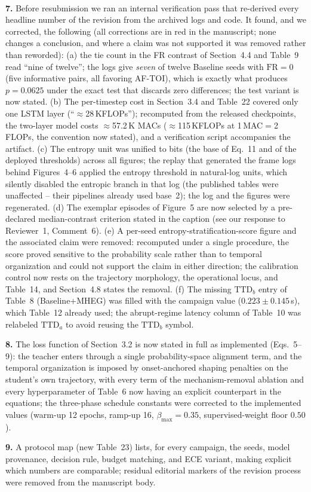 \documentclass[1p,12pt,authoryear]{elsarticle}
\begin{document}
~

\noindent \textbf{7.} Before resubmission we ran an internal verification pass that re-derived every headline number of the revision from the archived logs and code. It found, and we corrected, the following (all corrections are in red in the manuscript; none changes a conclusion, and where a claim was not supported it was removed rather than reworded): (a) the tie count in the FR contrast of Section~4.4 and Table~9 read ``nine of twelve''; the logs give \emph{seven} of twelve Baseline seeds with $\mathrm{FR}=0$ (five informative pairs, all favoring AF-TOI), which is exactly what produces $p=0.0625$ under the exact test that discards zero differences; the test variant is now stated. (b) The per-timestep cost in Section~3.4 and Table~22 covered only one LSTM layer (``$\approx$28\,KFLOPs''); recomputed from the released checkpoints, the two-layer model costs $\approx$57.2\,K MACs ($\approx$115\,KFLOPs at 1\,MAC${}={}$2\,FLOPs, the convention now stated), and a verification script accompanies the artifact. (c) The entropy unit was unified to bits (the base of Eq.~11 and of the deployed thresholds) across all figures; the replay that generated the frame logs behind Figures~4--6 applied the entropy threshold in natural-log units, which silently disabled the entropic branch in that log (the published tables were unaffected -- their pipelines already used base~2); the log and the figures were regenerated. (d) The exemplar episodes of Figure~5 are now selected by a pre-declared median-contrast criterion stated in the caption (see our response to Reviewer~1, Comment~6). (e) A per-seed entropy-stratification-score figure and the associated claim were removed: recomputed under a single procedure, the score proved sensitive to the probability scale rather than to temporal organization and could not support the claim in either direction; the calibration control now rests on the trajectory morphology, the operational locus, and Table~14, and Section~4.8 states the removal. (f) The missing $\mathrm{TTD}_b$ entry of Table~8 (Baseline+MHEG) was filled with the campaign value ($0.223 \pm 0.145$\,s), which Table~12 already used; the abrupt-regime latency column of Table~10 was relabeled $\mathrm{TTD}_a$ to avoid reusing the $\mathrm{TTD}_b$ symbol.

\vspace{2mm}
\noindent \textbf{8.} The loss function of Section~3.2 is now stated in full as implemented (Eqs.~5--9): the teacher enters through a single probability-space alignment term, and the temporal organization is imposed by onset-anchored shaping penalties on the student's own trajectory, with every term of the mechanism-removal ablation and every hyperparameter of Table~6 now having an explicit counterpart in the equations; the three-phase schedule constants were corrected to the implemented values (warm-up 12 epochs, ramp-up 16, $\beta_{\max}=0.35$, supervised-weight floor $0.50$).

\vspace{2mm}
\noindent \textbf{9.} A protocol map (new Table~23) lists, for every campaign, the seeds, model provenance, decision rule, budget matching, and ECE variant, making explicit which numbers are comparable; residual editorial markers of the revision process were removed from the manuscript body.
\end{document}
